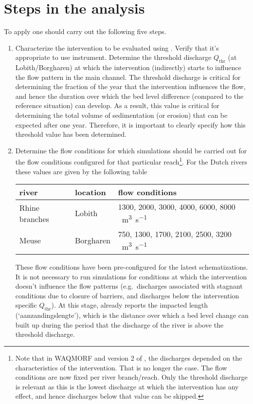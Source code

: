 \chapter{Steps in the analysis}\label{Chp:steps}

To apply \dfastmi one should carry out the following five steps.

\begin{enumerate}
\item Characterize the intervention to be evaluated using \dfastmi.
Verify that it's appropriate to use \dfastmi instrument.
Determine the threshold discharge $Q_\text{thr}$ (at Lobith/Borgharen) at which the intervention (indirectly) starts to influence the flow pattern in the main channel.
The threshold discharge is critical for determining the fraction of the year that the intervention influences the flow, and hence the duration over which the bed level difference (compared to the reference situation) can develop.
As a result, this value is critical for determining the total volume of sedimentation (or erosion) that can be expected after one year.
Therefore, it is important to clearly specify how this threshold value has been determined.

\item Determine the flow conditions for which \dflowfm simulations should be carried out for the flow conditions configured for that particular reach\footnote{Note that in WAQMORF and version 2 of \dfastmi, the discharges depended on the characteristics of the intervention.
That is no longer the case.
The flow conditions are now fixed per river branch/reach.
Only the threshold discharge is relevant as this is the lowest discharge at which the intervention has any effect, and hence discharges below that value can be skipped.}.
For the Dutch rivers these values are given by the following table
\newline
\newline
\begin{tabular}{l|l|l}
river & location & flow conditions \\ \hline
Rhine branches & Lobith & 1300, 2000, 3000, 4000, 6000, 8000 \SI{}{\metre\cubed\per\second}\\
Meuse & Borgharen & 750, 1300, 1700, 2100, 2500, 3200 \SI{}{\metre\cubed\per\second}
\end{tabular}
\newline
\newline
These flow conditions have been pre-configured for the latest \dflowfm schematizations.
It is not necessary to run simulations for conditions at which the intervention doesn't influence the flow patterns (e.g.~discharges associated with stagnant conditions due to closure of barriers, and discharges below the intervention specific $Q_\text{thr}$).
At this stage, \dfmi already reports the impacted length (`aanzandingslengte'), which is the distance over which a bed level change can built up during the period that the discharge of the river is above the threshold discharge.


\end{enumerate}
